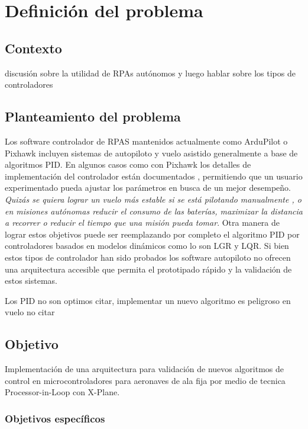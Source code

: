 \chapter{Definición del problema}

\section{Contexto}

discusión sobre la utilidad de RPAs autónomos y luego hablar sobre los tipos de controladores

\section{Planteamiento del problema}

Los software controlador de RPAS mantenidos actualmente como ArduPilot o Pixhawk incluyen sistemas de autopiloto y vuelo asistido generalmente a base de algoritmos PID. En algunos casos como con Pixhawk los detalles de implementación del controlador están documentados \cite{px4-control-diagram}, permitiendo que un usuario experimentado pueda ajustar los parámetros en busca de un mejor desempeño. \emph{Quizás se quiera lograr un vuelo más estable si se está pilotando manualmente \cite{betaflight-pid-tuning}, o en misiones autónomas reducir el consumo de las baterías, maximizar la distancia a recorrer o reducir el tiempo que una misión pueda tomar}. Otra manera de lograr estos objetivos puede ser reemplazando por completo el algoritmo PID por controladores basados en modelos dinámicos como lo son LGR y LQR. Si bien estos tipos de controlador han sido probados \cite{yt-lqr} los software autopiloto no ofrecen una arquitectura accesible que permita el prototipado rápido y la validación de estos sistemas.

Los PID no son optimos citar, implementar un nuevo algoritmo es peligroso en vuelo no citar

\section{Objetivo}

Implementación de una arquitectura para validación de nuevos algoritmos de control en microcontroladores para aeronaves de ala fija por medio de tecnica Processor-in-Loop con X-Plane.

\subsection{Objetivos específicos}

